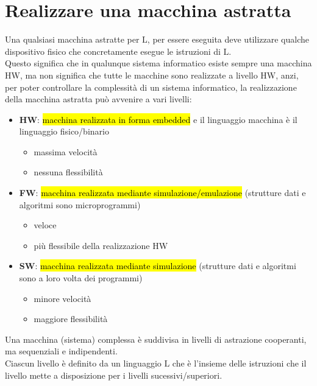 \section{Realizzare una macchina astratta}
Una qualsiasi macchina astratte per $\mathrm{L}$, per essere eseguita deve utilizzare qualche dispositivo fisico che concretamente esegue le istruzioni di $\mathrm{L}$.\\[0.2ex]
Questo significa che in qualunque sistema informatico esiste sempre una macchina HW, ma non significa che tutte le macchine sono realizzate a livello HW, anzi, per poter controllare la complessità di un sistema informatico, la realizzazione della macchina astratta può avvenire a vari livelli:
\begin{itemize}[label=$\triangleright$, itemsep=\smallskipamount]
    \item \textbf{HW}: \hl{macchina realizzata in forma embedded} e il linguaggio macchina è il linguaggio fisico/binario
    \begin{itemize}[itemsep=\smallskipamount]
        \item massima velocità
        \item nessuna flessibilità
    \end{itemize}
    \item \textbf{FW}: \hl{macchina realizzata mediante simulazione/emulazione} (strutture dati e algoritmi sono microprogrammi)
    \begin{itemize}[itemsep=\smallskipamount]
        \item veloce
        \item più flessibile della realizzazione HW
    \end{itemize}
    \item \textbf{SW}: \hl{macchina realizzata mediante simulazione} (strutture dati e algoritmi sono a loro volta dei programmi)
    \begin{itemize}[itemsep=\smallskipamount]
        \item minore velocità
        \item maggiore flessibilità
    \end{itemize}
\end{itemize}

Una macchina (sistema) complessa è suddivisa in livelli di astrazione cooperanti, ma sequenziali e indipendenti.\\[0.2ex]
Ciascun livello è definito da un linguaggio $\mathrm{L}$ che è l'insieme delle istruzioni che il livello mette a disposizione per i livelli sucessivi/superiori.

